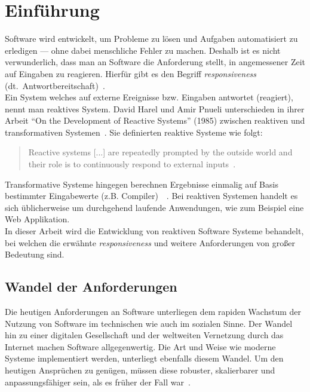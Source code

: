 \chapter{Einführung}\label{sec:einfuehrung}
Software wird entwickelt, um Probleme zu lösen und Aufgaben automatisiert zu erledigen --- ohne dabei menschliche Fehler zu machen. Deshalb ist es nicht verwunderlich, dass man an Software die Anforderung stellt, in angemessener Zeit auf Eingaben zu reagieren. Hierfür gibt es den Begriff \textit{responsiveness} (dt.\ Antwortbereitschaft)~\cite[S.~18]{kuhn_reactive_2015}.\\
Ein System welches auf externe Ereignisse bzw. Eingaben antwortet (reagiert), nennt man reaktives System. David Harel und Amir Pnueli unterschieden in ihrer Arbeit \enquote{On the Development of Reactive Systems} (1985) zwischen reaktiven und transformativen Systemen~\cite{harel_development_1985}. Sie definierten reaktive Systeme wie folgt:

\begin{quotation}
  Reactive systems [...] are repeatedly prompted by the outside world and their role is to continuously respond to external inputs~\cite{harel_development_1985}.
\end{quotation}

Transformative Systeme hingegen berechnen Ergebnisse einmalig auf Basis bestimmter Eingabewerte (z.B. Compiler)~\cite[S.~2]{carkci_dataflow_2014}~\cite{wieringa_design_2003}. Bei reaktiven Systemen handelt es sich üblicherweise um durchgehend laufende Anwendungen, wie zum Beispiel eine Web Applikation.\\
In dieser Arbeit wird die Entwicklung von reaktiven Software Systeme behandelt, bei welchen die erwähnte \textit{responsiveness} und weitere Anforderungen von großer Bedeutung sind.

\pagebreak

\section{Wandel der Anforderungen}
Die heutigen Anforderungen an Software unterliegen dem rapiden Wachstum der Nutzung von Software im technischen wie auch im sozialen Sinne. Der Wandel hin zu einer digitalen Gesellschaft und der weltweiten Vernetzung durch das Internet machen Software allgegenwertig. Die Art und Weise wie moderne Systeme implementiert werden, unterliegt ebenfalls diesem Wandel. Um den heutigen Ansprüchen zu genügen, müssen diese robuster, skalierbarer und anpassungsfähiger sein, als es früher der Fall war~\cite{boner_reactive_2014}.\\

